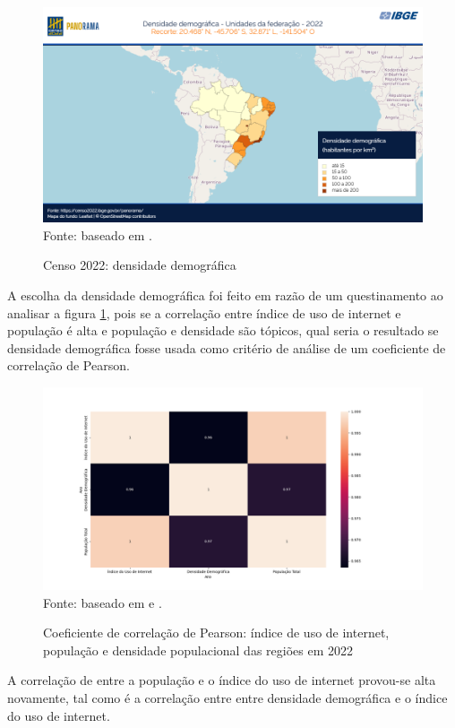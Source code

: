 \begin{figure}[H]
    \centering
    \caption{Censo 2022: densidade demográfica}
    \includegraphics[width=1\linewidth]{figuras/populacao/censo_2022_densidade_demografica.png}
    \label{fig:densidade_demografica}
    \footnotesize{Fonte: baseado em \cite{IBGE_censo_2022}.}
\end{figure}

A escolha da densidade demográfica foi feito em razão de um questinamento ao analisar a figura \ref{fig:densidade_demografica}, pois se a correlação entre índice de uso de internet e população é alta e população e densidade são tópicos, qual seria o resultado se densidade demográfica fosse usada como critério de análise de um coeficiente de correlação de Pearson.

\begin{figure}[H]
    \centering
    \caption{Coeficiente de correlação de Pearson: índice de uso de internet, população e densidade populacional das regiões em 2022}
    \includegraphics[width=1\linewidth]{figuras/internet/correlacao2.png}
    \label{fig:correlacao2}
    \footnotesize{Fonte: baseado em \cite{IBGE_censo_2022} e \cite{pnda_continua_anual_2016_2023}.}
\end{figure}

A correlação de entre a população e o índice do uso de internet provou-se alta novamente, tal como é a correlação entre entre densidade demográfica e o índice do uso de internet. 